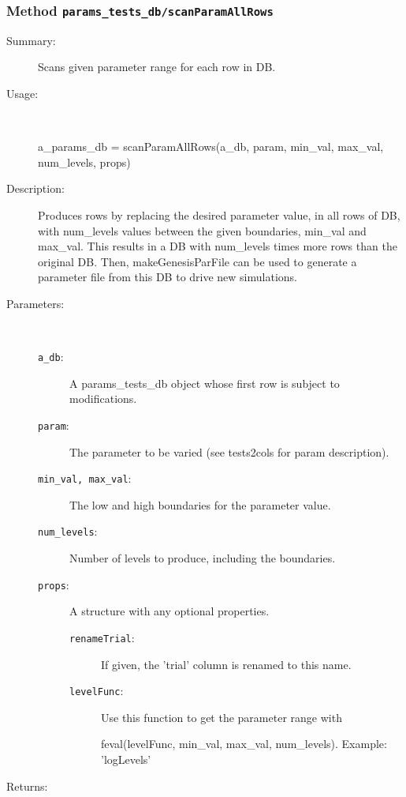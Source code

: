 \subsubsection[Method \texttt{scanParamAllRows}]{Method \texttt{params\_tests\_db/scanParamAllRows}}%
%
\label{ref_params_tests_db__scanParamAllRows}%
\hypertarget{ref_params_tests_db__scanParamAllRows}{}%
\begin{description}
\item[Summary:]Scans given parameter range for each row in DB.
%
\item[Usage:]~%
\begin{lyxcode}%
a\_params\_db = scanParamAllRows(a\_db, param, min\_val, max\_val, num\_levels, props)
%
\end{lyxcode}%
%
\item[Description:]%
Produces rows by replacing the desired parameter value, in all rows of DB, 
 with num\_levels values between the given boundaries, min\_val and max\_val. 
 This results in a DB with num\_levels times more rows than the original DB. 
 Then, makeGenesisParFile can be used to generate a parameter file from 
 this DB to drive new simulations.
\item[Parameters:]~
\begin{description}%
\item[\texttt{a\_db}:]
 A params\_tests\_db object whose first row is subject to modifications.
\item[\texttt{param}:]
 The parameter to be varied (see tests2cols for param description).
\item[\texttt{min\_val, max\_val}:]
 The low and high boundaries for the parameter value.
\item[\texttt{num\_levels}:]
 Number of levels to produce, including the boundaries.
\item[\texttt{props}:]
 A structure with any optional properties.
\begin{description}%
\item[\texttt{renameTrial}:]
 If given, the 'trial' column is renamed to this name.
\item[\texttt{levelFunc}:]
 Use this function to get the parameter range with 

feval(levelFunc, min\_val, max\_val, num\_levels). Example: 'logLevels'\end{description}%
\end{description}%
%
\item[Returns:]~


\end{description}
